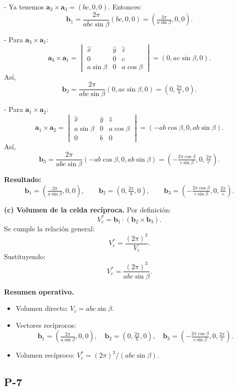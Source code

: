\documentclass{article}
\begin{document}
- Ya tenemos \(\mathbf{a}_2\times\mathbf{a}_3=(bc,0,0)\). Entonces:
\[
\mathbf{b}_1=\frac{2\pi}{abc\sin\beta}(bc,0,0)=\left(\tfrac{2\pi}{a\sin\beta},0,0\right).
\]

- Para \(\mathbf{a}_3\times\mathbf{a}_1\):
\[
\mathbf{a}_3\times\mathbf{a}_1=
\begin{vmatrix}
\hat{x} & \hat{y} & \hat{z}\\
0&0&c\\
a\sin\beta&0&a\cos\beta
\end{vmatrix}
=(0,ac\sin\beta,0).
\]
Así,
\[
\mathbf{b}_2=\frac{2\pi}{abc\sin\beta}(0,ac\sin\beta,0)=\left(0,\tfrac{2\pi}{b},0\right).
\]

- Para \(\mathbf{a}_1\times\mathbf{a}_2\):
\[
\mathbf{a}_1\times\mathbf{a}_2=
\begin{vmatrix}
\hat{x}&\hat{y}&\hat{z}\\
a\sin\beta&0&a\cos\beta\\
0&b&0
\end{vmatrix}
=(-ab\cos\beta,0,ab\sin\beta).
\]
Así,
\[
\mathbf{b}_3=\frac{2\pi}{abc\sin\beta}(-ab\cos\beta,0,ab\sin\beta)
=\left(-\tfrac{2\pi\cos\beta}{c\sin\beta},0,\tfrac{2\pi}{c}\right).
\]

\medskip
\textbf{Resultado:}  
\[
\mathbf{b}_1=\left(\tfrac{2\pi}{a\sin\beta},0,0\right),\qquad
\mathbf{b}_2=\left(0,\tfrac{2\pi}{b},0\right),\qquad
\mathbf{b}_3=\left(-\tfrac{2\pi\cos\beta}{c\sin\beta},0,\tfrac{2\pi}{c}\right).
\]

\medskip
\textbf{(c) Volumen de la celda recíproca.}  
Por definición:
\[
V_c^*=\mathbf{b}_1\cdot(\mathbf{b}_2\times\mathbf{b}_3).
\]
Se cumple la relación general:
\[
V_c^*=\frac{(2\pi)^3}{V_c}.
\]
Sustituyendo:
\[
V_c^*=\frac{(2\pi)^3}{abc\sin\beta}.
\]

\medskip
\textbf{Resumen operativo.}
\begin{itemize}
\item Volumen directo: \(V_c=abc\sin\beta\).
\item Vectores recíprocos:
\[
\mathbf{b}_1=\left(\tfrac{2\pi}{a\sin\beta},0,0\right),\quad
\mathbf{b}_2=\left(0,\tfrac{2\pi}{b},0\right),\quad
\mathbf{b}_3=\left(-\tfrac{2\pi\cos\beta}{c\sin\beta},0,\tfrac{2\pi}{c}\right).
\]
\item Volumen recíproco: \(V_c^*=(2\pi)^3/(abc\sin\beta).\)
\end{itemize}


\subsection{P-7}
\end{document}
